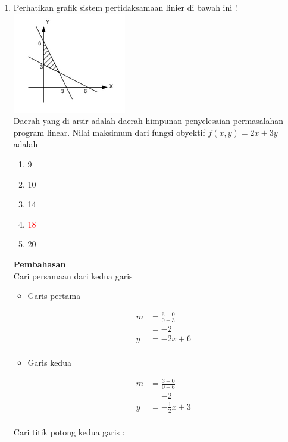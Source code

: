 \documentclass{report}
\newcommand{\options}[5]{
\begin{enumerate}[label=\alph*.]
	\item #1
	\item #2
	\item #3
	\item #4
	\item #5
\end{enumerate}
}
\newcommand{\pemb}{ \textbf{Pembahasan} \\}
\begin{document}
\begin{enumerate}
\item Perhatikan grafik sistem pertidaksamaan linier di bawah ini ! \\
\includegraphics{graf_pertidak.png} \\
Daerah yang di arsir adalah daerah himpunan penyelesaian permasalahan program linear. Nilai maksimum dari fungsi obyektif $f(x,y) = 2x+3y$ adalah
\options
{9}
{10}
{14}
{\textcolor{red}{18}}
{20}
\pemb
Cari persamaan dari kedua garis\\
\begin{itemize}
	\item Garis pertama \\
	\begin{align*}
		m&=\frac{6-0}{0-3}\\
		&=-2\\
		y&=-2x+6\\
	\end{align*}
	\item Garis kedua \\
	\begin{align*}
		m&=\frac{3-0}{0-6}\\
		&=-2\\
		y&=-\frac{1}{2}x+3\\
	\end{align*}
\end{itemize}
Cari titik potong kedua garis :
	\begin{center}
	\begin{tabular}{c}

\end{tabular}
\end{center}
\end{enumerate}
\end{document}
